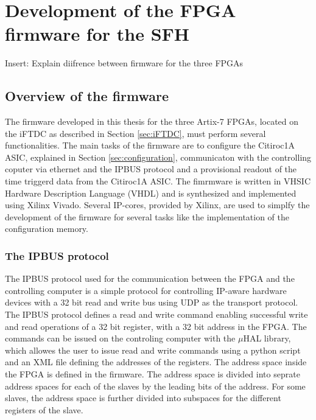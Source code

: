 \chapter{Development of the FPGA firmware for the SFH}\label{cha:development}
Insert: Explain diifrence between firmware for the three FPGAs
\section{Overview of the firmware} 
The firmware developed in this thesis for the three Artix-7 FPGAs, located on the iFTDC as described in Section \ref{sec:iFTDC}, must perform several functionalities.
The main tasks of the firmware are to configure the Citiroc1A ASIC, explained in Section \ref{sec:configuration},
 communicaton with the controlling coputer via ethernet and the IPBUS protocol and a provisional readout of the time triggerd data from the Citiroc1A ASIC.
\newline
The fimrmware is written in VHSIC Hardware Description Language (VHDL) and is synthesized and implemented using Xilinx Vivado.
Several IP-cores, provided by Xilinx, are used to simplfy the development of the firmware for several tasks like the implementation of the configuration memory.
\subsection{The IPBUS protocol}
The IPBUS protocol used for the communication between the FPGA and the controlling computer is a simple protocol for controlling IP-aware hardware devices with a 32 bit read and write bus using UDP as the transport protocol.\autocite{IPBUS_article}
\newline
The IPBUS protocol defines a read and write command enabling successful write and read operations of a 32 bit register, with a 32 bit address in the FPGA.    
\newline
The commands can be issued on the controling computer with the $\mu$HAL library, which allowes the user to issue read and write commands using a python script and an XML file defining the addresses of the registers.\autocite{IPBUS_article}
\newline
The address space inside the FPGA is defined in the firmware. The address space is divided into seprate address spaces for each of the slaves by the leading bits of the address.
For some slaves, the address space is further divided into subspaces for the different registers of the slave.


